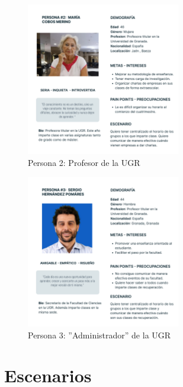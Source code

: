 \begin{figure}[H]
    \centering
    \includegraphics[width=0.6\textwidth]{figures/04_persona_2.png}
    \caption{Persona 2: Profesor de la UGR}
    \label{fig:persona_2}
\end{figure}

\begin{figure}[H]
    \centering
    \includegraphics[width=0.6\textwidth]{figures/04_persona_3.png}
    \caption{Persona 3: ''Administrador'' de la UGR}
    \label{fig:persona_3}
\end{figure}

\section{Escenarios}

